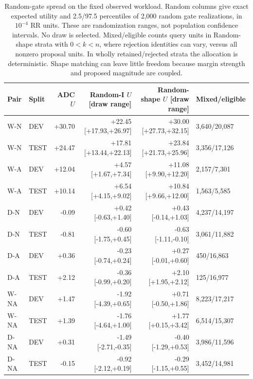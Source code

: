 \begin{table}[htbp]
\centering\footnotesize\setlength{\tabcolsep}{3pt}
\caption{Random-gate spread on the fixed observed workload. Random columns give exact expected utility and 2.5/97.5 percentiles of 2,000 random gate realizations, in $10^{-4}$ RR units. These are randomization ranges, not population confidence intervals. No draw is selected. Mixed/eligible counts query units in Random-shape strata with $0<k<n$, where rejection identities can vary, versus all nonzero proposal units. In wholly retained/rejected strata the allocation is deterministic. Shape matching can leave little freedom because margin strength and proposed magnitude are coupled.}
\label{tab:rejection-random}
\begin{tabular}{llrrrl}
\toprule
Pair & Split & ADC $U$ & Random-I $U$ [draw range] & Random-shape $U$ [draw range] & Mixed/eligible\\
\midrule
W-N & DEV & +30.70 & +22.45 [+17.93,+26.97] & +30.00 [+27.73,+32.15] & 3,640/20,087\\
W-N & TEST & +24.47 & +17.81 [+13.44,+22.13] & +23.84 [+21.73,+25.96] & 3,356/17,126\\
W-A & DEV & +12.04 & +4.57 [+1.67,+7.34] & +11.08 [+9.90,+12.20] & 2,157/7,301\\
W-A & TEST & +10.14 & +6.54 [+4.15,+9.02] & +10.84 [+9.66,+12.00] & 1,563/5,585\\
D-N & DEV & -0.09 & +0.42 [-0.63,+1.40] & +0.43 [-0.14,+1.03] & 4,237/14,197\\
D-N & TEST & -0.81 & -0.60 [-1.75,+0.45] & -0.63 [-1.11,-0.10] & 3,061/11,882\\
D-A & DEV & +0.36 & -0.23 [-0.74,+0.24] & +0.27 [-0.01,+0.60] & 450/16,863\\
D-A & TEST & +2.12 & -0.36 [-0.99,+0.20] & +2.10 [+1.95,+2.12] & 125/16,977\\
W-NA & DEV & +1.47 & -1.92 [-4.39,+0.65] & +0.71 [-0.50,+1.86] & 8,223/17,217\\
W-NA & TEST & +1.39 & -1.76 [-4.64,+1.00] & +1.77 [+0.15,+3.42] & 6,514/15,307\\
D-NA & DEV & +0.31 & -1.49 [-2.71,-0.35] & -0.40 [-1.29,+0.53] & 3,986/11,596\\
D-NA & TEST & -0.15 & -0.92 [-2.12,+0.19] & -0.29 [-1.15,+0.55] & 3,452/14,981\\
\bottomrule
\end{tabular}
\end{table}
